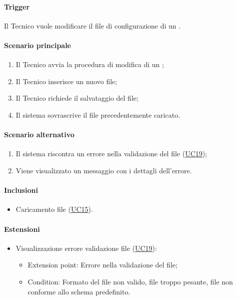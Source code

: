 \paragraph*{Trigger}
Il Tecnico vuole modificare il file di configurazione di un .

\paragraph*{Scenario principale}
\begin{enumerate}
  \item Il Tecnico avvia la procedura di modifica di un ;
  \item Il Tecnico inserisce un nuovo file;
  \item Il Tecnico richiede il salvataggio del file;
  \item Il sistema sovrascrive il file precedentemente caricato.
\end{enumerate}

\paragraph*{Scenario alternativo}
\begin{enumerate}
  \item Il sistema riscontra un errore nella validazione del file (\hyperref[UC19]{UC19});
  \item Viene visualizzato un messaggio con i dettagli dell'errore.
\end{enumerate}

\paragraph*{Inclusioni}
\begin{itemize}
  \item Caricamento file  (\hyperref[UC15]{UC15}).
\end{itemize}

\paragraph*{Estensioni}
\begin{itemize}
  \item Visualizzazione errore validazione file (\hyperref[UC19]{UC19}):
  \begin{itemize}
    \item Extension point: Errore nella validazione del file;
    \item Condition: Formato del file non valido, file troppo pesante, file non conforme allo schema predefinito.
  \end{itemize}
\end{itemize}